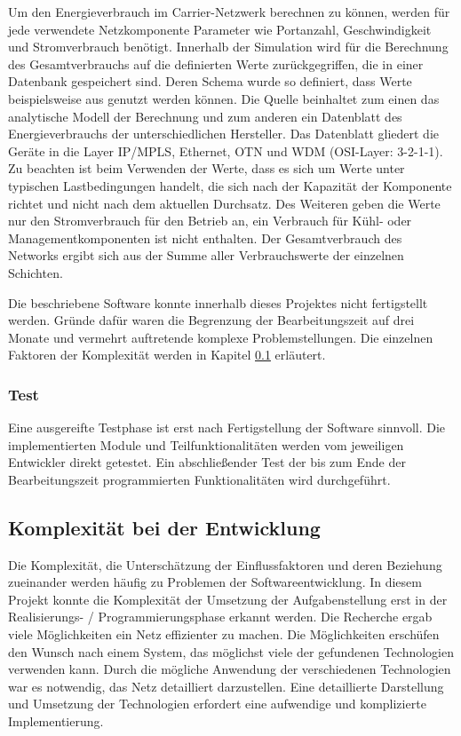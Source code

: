 Um den Energieverbrauch im Carrier-Netzwerk berechnen zu können, werden für jede verwendete Netzkomponente Parameter wie Portanzahl, Geschwindigkeit und Stromverbrauch benötigt. Innerhalb der Simulation wird für die Berechnung des Gesamtverbrauchs auf die definierten Werte zurückgegriffen, die in einer Datenbank gespeichert sind. Deren Schema wurde so definiert, dass Werte beispielsweise aus \cite{vanhedde} genutzt werden können. Die Quelle beinhaltet zum einen das analytische Modell der Berechnung und zum anderen ein Datenblatt \cite{vanhsheet} des Energieverbrauchs der unterschiedlichen Hersteller. Das Datenblatt gliedert die Geräte in die Layer IP/MPLS, Ethernet, OTN und WDM (OSI-Layer: 3-2-1-1). Zu beachten ist beim Verwenden der Werte, dass es sich um Werte unter typischen Lastbedingungen handelt, die sich nach der Kapazität der Komponente richtet und nicht nach dem aktuellen Durchsatz. Des Weiteren geben die Werte nur den Stromverbrauch für den Betrieb an, ein Verbrauch für Kühl- oder Managementkomponenten ist nicht enthalten.
Der Gesamtverbrauch des Networks ergibt sich aus der Summe aller Verbrauchswerte der einzelnen Schichten.

Die beschriebene Software konnte innerhalb dieses Projektes nicht fertigstellt werden. Gründe dafür waren die Begrenzung der Bearbeitungszeit auf drei Monate und vermehrt auftretende komplexe Problemstellungen. Die einzelnen Faktoren der Komplexität werden in Kapitel \ref{subsec:VorgKomplx} erläutert.

\subsubsection{Test}
Eine ausgereifte Testphase ist erst nach Fertigstellung der Software sinnvoll. Die implementierten Module und Teilfunktionalitäten werden vom jeweiligen Entwickler direkt getestet. Ein abschließender Test der bis zum Ende der Bearbeitungszeit programmierten Funktionalitäten wird durchgeführt.


\subsection{Komplexität bei der Entwicklung} \label{subsec:VorgKomplx}
Die Komplexität, die Unterschätzung der Einflussfaktoren und deren Beziehung zueinander werden häufig zu Problemen der Softwareentwicklung. In diesem Projekt konnte die Komplexität der Umsetzung der Aufgabenstellung erst in der Realisierungs- / Programmierungsphase erkannt werden. Die Recherche ergab viele Möglichkeiten ein  Netz effizienter zu machen. Die Möglichkeiten erschüfen den Wunsch nach einem  System, das möglichst viele der gefundenen Technologien verwenden kann. Durch die mögliche Anwendung der verschiedenen Technologien war es notwendig, das Netz detailliert darzustellen. Eine detaillierte Darstellung und Umsetzung der Technologien erfordert eine aufwendige und komplizierte Implementierung. 

